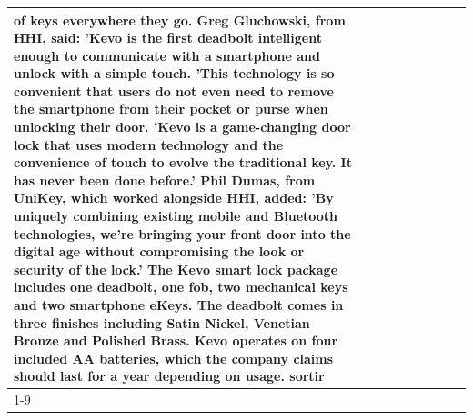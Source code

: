 \begin{table}[H]
\begin{tabular}{lllrlllll}
of keys everywhere they go. Greg Gluchowski, from HHI, said: 'Kevo is the first deadbolt intelligent enough to communicate with a smartphone and unlock with a simple touch. 'This technology is so convenient that users do not even need to remove the smartphone from their pocket or purse when unlocking their door. 'Kevo is a game-changing door lock that uses modern technology and the convenience of touch to evolve the traditional key. It has never been done before.' Phil Dumas, from UniKey, which worked alongside HHI, added: 'By uniquely combining existing mobile and Bluetooth technologies, we’re bringing your front door into the digital age without compromising the look or security of the lock.' The Kevo smart lock package includes one deadbolt, one fob, two mechanical keys and two smartphone eKeys. The deadbolt comes in three finishes including Satin Nickel, Venetian Bronze and Polished Brass. Kevo operates on four included AA batteries, which the company claims should last for a year depending on usage. sortir \\
\cline{1-9}

\end{tabular}
\end{table}
